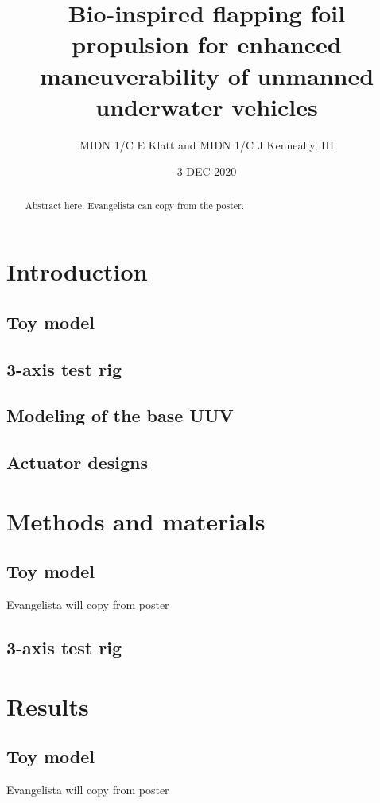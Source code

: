 \documentclass[10pt]{article}
\title{Bio-inspired flapping foil propulsion for enhanced maneuverability of unmanned underwater vehicles}
\author{MIDN 1/C E Klatt and MIDN 1/C J Kenneally, III}
\date{3 DEC 2020}
\begin{document}
\maketitle
\begin{abstract}
    Abstract here. Evangelista can copy from the poster. 
\end{abstract}


\section{Introduction}
\subsection{Toy model}
\subsection{3-axis test rig}
\subsection{Modeling of the base UUV}
\subsection{Actuator designs}

\section{Methods and materials}
\subsection{Toy model}
Evangelista will copy from poster
\subsection{3-axis test rig}

\section{Results}
\subsection{Toy model}
Evangelista will copy from poster
\end{document}
